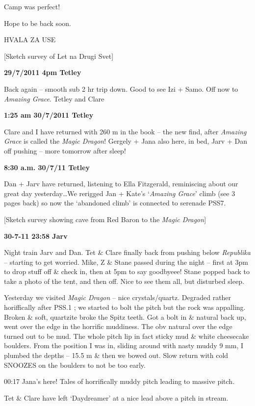 Camp was perfect!

Hope to be back soon.

HVALA ZA USE

{[}Sketch survey of Let na Drugi Svet{]}

\textbf{29/7/2011 4pm Tetley}

Back again -- smooth sub 2 hr trip down. Good to see Izi + Samo. Off now
to \emph{Amazing Grace}. Tetley and Clare

\textbf{1:25 am 30/7/2011 Tetley}

Clare and I have returned with 260 m in the book -- the new find, after
\emph{Amazing Grace} is called the \emph{Magic Dragon}! Gergely + Jana
also here, in bed, Jarv + Dan off pushing -- more tomorrow after sleep!

\textbf{8:30 a.m. 30/7/11 Tetley}

Dan + Jarv have returned, listening to Ella Fitzgerald, reminiscing
about our great day yesterday\ldots{}We rerigged Jan + Kate's
`\emph{Amazing Grace}' climb (see 3 pages back) so now the `abandoned
climb' is connected to serenade PSS7.

{[}Sketch survey showing cave from Red Baron to the \emph{Magic
Dragon}{]}

\textbf{30-7-11 23:58 Jarv}

Night train Jarv and Dan. Tet \& Clare finally back from pushing below
\emph{Republika} -- starting to get worried. Mike, Z \& Stane passed
during the night -- first at 3pm to drop stuff off \& check in, then at
5pm to say goodbyeee! Stane popped back to take a photo of the tent, and
then off. Nice to see them all, but disturbed sleep.

Yesterday we visited \emph{Magic Dragon} -- nice crystals/quartz.
Degraded rather horiffically after PSS.1 ; we started to bolt the pitch
but the rock was appalling. Broken \& soft, quartzite broke the Spitz
teeth. Got a bolt in \& natural back up, went over the edge in the
horrific muddiness. The obv natural over the edge turned out to be mud.
The whole pitch lip in fact sticky mud \& white cheesecake boulders.
From the position I was in, sliding around with nasty muddy 9 mm, I
plumbed the depths -- 15.5 m \& then we bowed out. Slow return with cold
SNOOZES on the boulders to not be too early.

00:17 Jana's here! Tales of horrifically muddy pitch leading to massive
pitch.

Tet \& Clare have left `Daydreamer' at a nice lead above a pitch in
stream.

